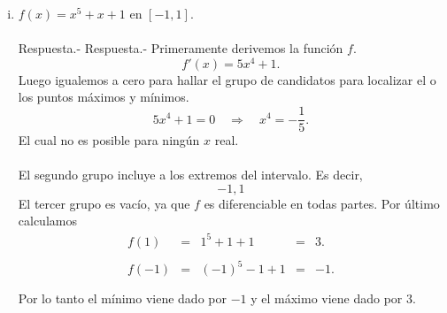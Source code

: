 \begin{enumerate}[\bfseries 1.]
\begin{enumerate}[(i)]
	    \item $f(x)=x^5+x+1$ en $[-1,1]$.\\\\
		Respuesta.-\; 
		Respuesta.-\; Primeramente derivemos la función $f$.
		$$f'(x)=5x^4+1.$$
		Luego igualemos a cero para hallar el grupo de candidatos para localizar el o los puntos máximos y mínimos.
		$$5x^4+1=0 \quad \Rightarrow \quad x^4=-\dfrac{1}{5}.$$
		El cual no es posible para ningún $x$ real.\\\\
		El segundo grupo incluye a los extremos del intervalo. Es decir,
		$$-1,1$$
		El tercer grupo es vacío, ya que $f$ es diferenciable en todas partes. Por último calculamos 
		$$\begin{array}{ccccl}
		    f\left(1\right) &=& 1^5+1+1&=&3.\\\\
		    f\left(-1\right) &=& (-1)^5-1+1 &=&-1.\\\\
		\end{array}$$
		Por lo tanto el mínimo viene dado por $-1$ y el máximo viene dado por $3.$\\\\


\end{enumerate}
\end{enumerate}
